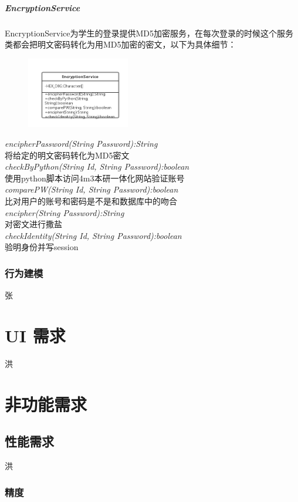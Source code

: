 \documentclass[UTF8]{ctexart}
\begin{document}
\subparagraph{EncryptionService}
EncryptionService为学生的登录提供MD5加密服务，在每次登录的时候这个服务类都会把明文密码转化为用MD5加密的密文，以下为具体细节：
\newline
\begin{figure}[H]
\centering
\includegraphics[width = 0.4\textwidth]{Encryption-rs.png}
\end{figure}
\begin{center}
\emph{encipherPassword(String Password):String}\\
将给定的明文密码转化为MD5密文\\
\emph{checkByPython(String Id, String Password):boolean}\\
使用python脚本访问4m3本研一体化网站验证账号\\
\emph{comparePW(String Id, String Password):boolean}\\
比对用户的账号和密码是不是和数据库中的吻合\\
\emph{encipher(String Password):String}\\
对密文进行撒盐\\
\emph{checkIdentity(String Id, String Password):boolean}\\
验明身份并写session
\end{center}

\subsubsection{行为建模}
张

\section{UI 需求}
洪

\section{非功能需求}
\subsection{性能需求}
洪
\subsubsection{精度}
\end{document}
